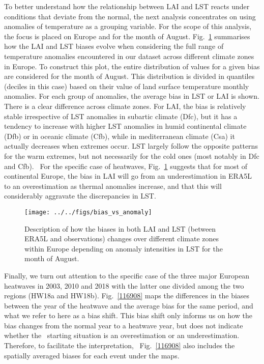 \documentclass[gmd, manuscript]{copernicus}
\begin{document}
{To better understand how the relationship between LAI and LST reacts
under conditions that deviate from the normal, the next analysis
concentrates on using anomalies of temperature as a grouping variable.
For the scope of this analysis, the focus is placed on Europe and for the month of August.
Fig.~{\ref{560364}} summarises how the LAI and LST
biases evolve when considering the full range of temperature anomalies
encountered in our dataset across different climate zones in Europe. To
construct this plot, the entire distribution of values for a given bias
are considered for the month of August. This distribution is
divided in quantiles (deciles in this case) based on their value of land
surface temperature monthly anomalies. For each group of anomalies, the
average bias in LST or LAI is shown. There is a clear difference across
climate zones. For LAI, the bias is relatively stable irrespective of
LST anomalies in subartic climate (Dfc), but it has a tendency to
increase with higher LST anomalies in humid continental climate (Dfb) or
in oceanic climate (Cfb), while in mediterranean climate (Csa) it
actually decreases when extremes occur. LST largely follow the opposite
patterns for the warm extremes, but not necessarily for the cold ones
(most notably in Dfc and Cfb).~ For the specific case of heatwaves,
Fig.~{\ref{560364}} suggests that for most of
continental Europe, the bias in LAI will go from an underestimation in
ERA5L to an overestimation as thermal anomalies increase, and that this
will considerably aggravate the discrepancies in LST.

\begin{figure}[H]
\begin{center}
\texttt{[image: ../../figs/bias\_vs\_anomaly]}
\caption{{Description of how the biases in both LAI and LST (between ERA5L and
observations) changes over different climate zones within Europe
depending on anomaly intensities in LST for the month of August.
{\label{560364}}%
}}
\end{center}
\end{figure}

Finally, we turn out attention to the specific case of the three major
European heatwaves in 2003, 2010 and 2018 with the latter one divided
among the two regions (HW18a and HW18b).
Fig.~{\ref{116908}} maps the differences in the biases
between the year of the heatwave and the average bias for the same
period, and what we refer to here as a bias shift. This bias shift only
informs us on how the bias changes from the normal year to a heatwave
year, but does not indicate whether the~ starting situation is an
overestimation or an underestimation. Therefore, to facilitate the
interpretation,~ Fig.~{\ref{116908}} also includes the
spatially averaged biases for each event under the maps.~

}
\end{document}
